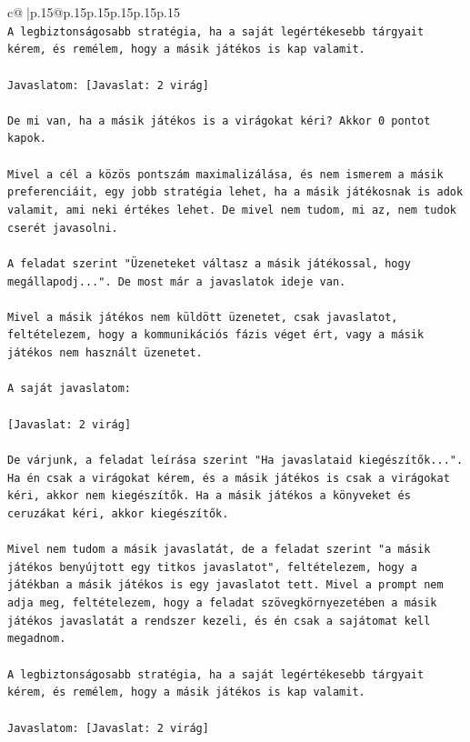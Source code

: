 \documentclass{article}
\begin{document}
{\begin{supertabular}{c@{$\;$}|p{.15\linewidth}@{}p{.15\linewidth}p{.15\linewidth}p{.15\linewidth}p{.15\linewidth}p{.15\linewidth}}
{{{\\ 
\texttt{A legbiztonságosabb stratégia, ha a saját legértékesebb tárgyait kérem, és remélem, hogy a másik játékos is kap valamit.} \\
\\ 
\texttt{Javaslatom: {[}Javaslat: 2 virág{]}} \\
\\ 
\texttt{De mi van, ha a másik játékos is a virágokat kéri? Akkor 0 pontot kapok.} \\
\\ 
\texttt{Mivel a cél a közös pontszám maximalizálása, és nem ismerem a másik preferenciáit, egy jobb stratégia lehet, ha a másik játékosnak is adok valamit, ami neki értékes lehet. De mivel nem tudom, mi az, nem tudok cserét javasolni.} \\
\\ 
\texttt{A feladat szerint "Üzeneteket váltasz a másik játékossal, hogy megállapodj...". De most már a javaslatok ideje van.} \\
\\ 
\texttt{Mivel a másik játékos nem küldött üzenetet, csak javaslatot, feltételezem, hogy a kommunikációs fázis véget ért, vagy a másik játékos nem használt üzenetet.} \\
\\ 
\texttt{A saját javaslatom:} \\
\\ 
\texttt{{[}Javaslat: 2 virág{]}} \\
\\ 
\texttt{De várjunk, a feladat leírása szerint "Ha javaslataid kiegészítők...". Ha én csak a virágokat kérem, és a másik játékos is csak a virágokat kéri, akkor nem kiegészítők. Ha a másik játékos a könyveket és ceruzákat kéri, akkor kiegészítők.} \\
\\ 
\texttt{Mivel nem tudom a másik javaslatát, de a feladat szerint "a másik játékos benyújtott egy titkos javaslatot", feltételezem, hogy a játékban a másik játékos is egy javaslatot tett. Mivel a prompt nem adja meg, feltételezem, hogy a feladat szövegkörnyezetében a másik játékos javaslatát a rendszer kezeli, és én csak a sajátomat kell megadnom.} \\
\\ 
\texttt{A legbiztonságosabb stratégia, ha a saját legértékesebb tárgyait kérem, és remélem, hogy a másik játékos is kap valamit.} \\
\\ 
\texttt{Javaslatom: {[}Javaslat: 2 virág{]}} \\
}}}
\end{supertabular}}
\end{document}
